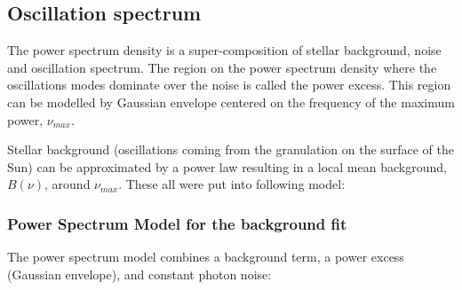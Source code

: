 \documentclass[12pt]{article}
\begin{document}
\subsection{Oscillation spectrum}
The power spectrum density is a super-composition of stellar background, noise and oscillation spectrum. The region on the power spectrum density where the oscillations modes dominate over the noise is called the power excess. This region can be modelled by Gaussian envelope centered on the frequency of the maximum power, $\nu_{max}$.  



Stellar background (oscillations coming from the granulation on the surface of the Sun) can be approximated by a power law resulting in a local mean background, $B(\nu)$, around $\nu_{max}$. These all were put into following model:





\subsubsection*{Power Spectrum Model for the background fit}
The power spectrum model combines a background term, a power excess (Gaussian envelope), and constant photon noise:
\end{document}
